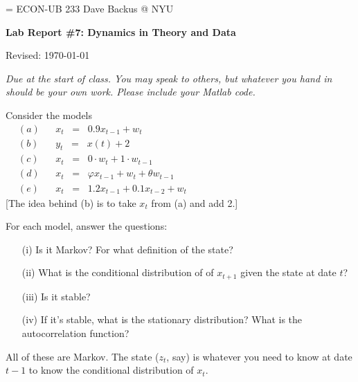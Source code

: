 \documentclass[11pt]{exam}
\begin{document}
\parskip=\bigskipamount
\parindent=0.0in
\thispagestyle{empty}
{\large ECON-UB 233 \hfill Dave Backus @ NYU}

\bigskip\bigskip
\centerline{\Large \bf Lab Report \#7:  Dynamics in Theory and Data}
\centerline{Revised: \today}

\bigskip
{\it Due at the start of class.
You may speak to others, but whatever you hand in should be your own work.
Please include your Matlab code.}

\begin{questions}


Consider the models
\begin{eqnarray*}
(a) &&  x_t \;\;=\;\; 0.9 x_{t-1} +  w_t \phantom{xxxxxxxxxxxxxxxxxxxxxxxxxxxxxxxxxxxx}\\
(b) &&  y_t \;\;=\;\; x(t) + 2 \\
(c) &&  x_t \;\;=\;\; 0 \cdot w_t + 1 \cdot w_{t-1} \\
(d) &&  x_t \;\;=\;\; \varphi x_{t-1} + w_t + \theta  w_{t-1} \\
(e) &&  x_t \;\;=\;\; 1.2 x_{t-1} + 0.1 x_{t-2} +  w_t
\end{eqnarray*}
[The idea behind (b) is to take $x_t$ from (a) and add 2.]

For each model,  answer the questions:
\begin{enumerate}
\item [(i)] Is it Markov?  For what definition of the state? %
\item [(ii)] What is the conditional distribution of of $x_{t+1}$ given
the state at date $t$? %
\item [(iii)] Is it stable?
\item [(iv)] If it's stable, what is the stationary distribution?
What is the autocorrelation function?
\end{enumerate}


\begin{solution}
All of these are Markov.
The state ($z_t$, say) is whatever you need to know at date $t-1$ to
know the conditional distribution of $x_t$.
\begin{parts}

\end{parts}
\end{solution}
\end{questions}
\end{document}
